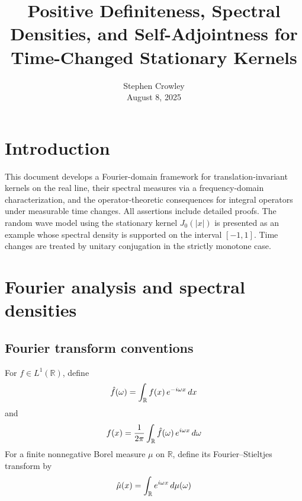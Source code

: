 \documentclass{article}
\newcommand{\tmaffiliation}[1]{\\ #1}
\begin{document}
\title{Positive Definiteness, Spectral Densities, and Self-Adjointness for
Time-Changed Stationary Kernels}

\author{
  Stephen Crowley
  \tmaffiliation{August 8, 2025}
}

\maketitle

{\tableofcontents}

\section{Introduction}

This document develops a Fourier-domain framework for translation-invariant
kernels on the real line, their spectral measures via a frequency-domain
characterization, and the operator-theoretic consequences for integral
operators under measurable time changes. All assertions include detailed
proofs. The random wave model using the stationary kernel $J_0 (|x|)$ is
presented as an example whose spectral density is supported on the interval
$[- 1, 1]$. Time changes are treated by unitary conjugation in the strictly
monotone case.

\section{Fourier analysis and spectral densities}

\subsection{Fourier transform conventions}

For $f \in L^1 (\mathbb{R})$, define
\begin{equation}
  \hat{f} (\omega) = \int_{\mathbb{R}} f (x)  \hspace{0.17em} e^{- i \omega x}
  \hspace{0.17em} dx
\end{equation}
and
\begin{equation}
  f (x) = \frac{1}{2 \pi}  \int_{\mathbb{R}} \hat{f} (\omega)  \hspace{0.17em}
  e^{i \omega x}  \hspace{0.17em} d \omega
\end{equation}
For a finite nonnegative Borel measure $\mu$ on $\mathbb{R}$, define its
Fourier--Stieltjes transform by
\begin{equation}
  \hat{\mu} (x) = \int_{\mathbb{R}} e^{i \omega x}  \hspace{0.17em} d \mu
  (\omega)
\end{equation}
\end{document}
